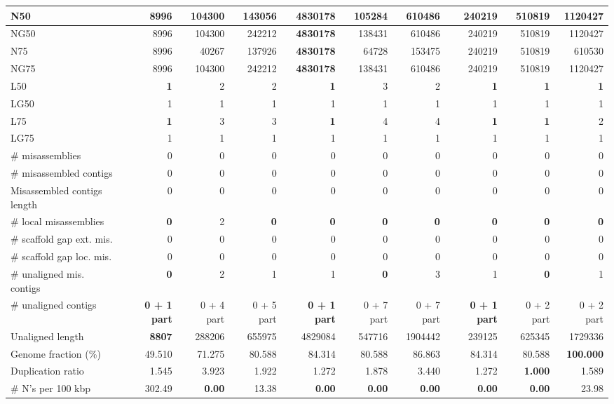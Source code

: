\documentclass[12pt,a4paper]{article}
\begin{document}
\begin{table}[ht]
\begin{center}
\begin{tabular}{|l*{9}{|r}|}
N50 & 8996 & 104300 & 143056 & {\bf 4830178} & 105284 & 610486 & 240219 & 510819 & 1120427 \\ \hline
NG50 & 8996 & 104300 & 242212 & {\bf 4830178} & 138431 & 610486 & 240219 & 510819 & 1120427 \\ \hline
N75 & 8996 & 40267 & 137926 & {\bf 4830178} & 64728 & 153475 & 240219 & 510819 & 610530 \\ \hline
NG75 & 8996 & 104300 & 242212 & {\bf 4830178} & 138431 & 610486 & 240219 & 510819 & 1120427 \\ \hline
L50 & {\bf 1} & 2 & 2 & {\bf 1} & 3 & 2 & {\bf 1} & {\bf 1} & {\bf 1} \\ \hline
LG50 & 1 & 1 & 1 & 1 & 1 & 1 & 1 & 1 & 1 \\ \hline
L75 & {\bf 1} & 3 & 3 & {\bf 1} & 4 & 4 & {\bf 1} & {\bf 1} & 2 \\ \hline
LG75 & 1 & 1 & 1 & 1 & 1 & 1 & 1 & 1 & 1 \\ \hline
\# misassemblies & 0 & 0 & 0 & 0 & 0 & 0 & 0 & 0 & 0 \\ \hline
\# misassembled contigs & 0 & 0 & 0 & 0 & 0 & 0 & 0 & 0 & 0 \\ \hline
Misassembled contigs length & 0 & 0 & 0 & 0 & 0 & 0 & 0 & 0 & 0 \\ \hline
\# local misassemblies & {\bf 0} & 2 & {\bf 0} & {\bf 0} & {\bf 0} & {\bf 0} & {\bf 0} & {\bf 0} & {\bf 0} \\ \hline
\# scaffold gap ext. mis. & 0 & 0 & 0 & 0 & 0 & 0 & 0 & 0 & 0 \\ \hline
\# scaffold gap loc. mis. & 0 & 0 & 0 & 0 & 0 & 0 & 0 & 0 & 0 \\ \hline
\# unaligned mis. contigs & {\bf 0} & 2 & 1 & 1 & {\bf 0} & 3 & 1 & {\bf 0} & 1 \\ \hline
\# unaligned contigs & {\bf 0 + 1 part} & 0 + 4 part & 0 + 5 part & {\bf 0 + 1 part} & 0 + 7 part & 0 + 7 part & {\bf 0 + 1 part} & 0 + 2 part & 0 + 2 part \\ \hline
Unaligned length & {\bf 8807} & 288206 & 655975 & 4829084 & 547716 & 1904442 & 239125 & 625345 & 1729336 \\ \hline
Genome fraction (\%) & 49.510 & 71.275 & 80.588 & 84.314 & 80.588 & 86.863 & 84.314 & 80.588 & {\bf 100.000} \\ \hline
Duplication ratio & 1.545 & 3.923 & 1.922 & 1.272 & 1.878 & 3.440 & 1.272 & {\bf 1.000} & 1.589 \\ \hline
\# N's per 100 kbp & 302.49 & {\bf 0.00} & 13.38 & {\bf 0.00} & {\bf 0.00} & {\bf 0.00} & {\bf 0.00} & {\bf 0.00} & 23.98 \\ \hline

\end{tabular}
\end{center}
\end{table}
\end{document}
